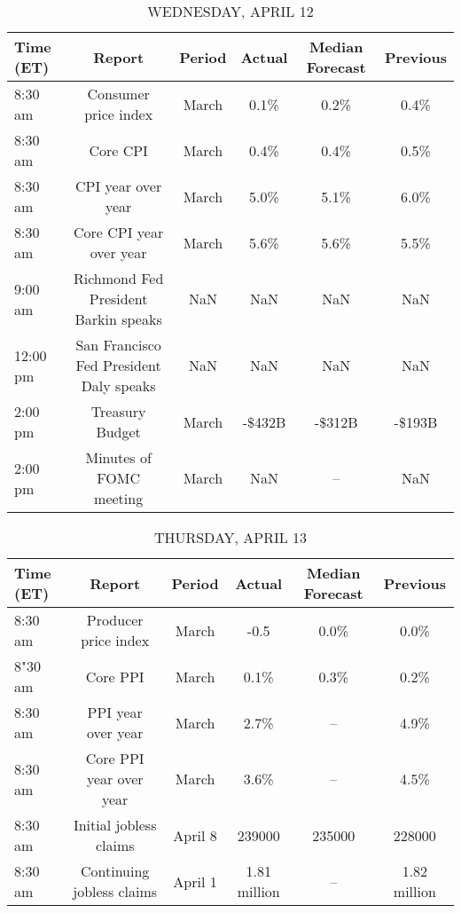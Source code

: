 \documentclass{article}%
\begin{document}
\begin{table}[htbp]%
\caption{WEDNESDAY, APRIL 12}%
\centering%
\begin{adjustbox}{width=1\textwidth}%
\begin{tabular}{lccccc}
\toprule
Time (ET) &                                  Report & Period & Actual & Median Forecast & Previous \\
\midrule
  8:30 am &                    Consumer price index &  March &   0.1\% &            0.2\% &     0.4\% \\
  8:30 am &                                Core CPI &  March &   0.4\% &            0.4\% &     0.5\% \\
  8:30 am &                      CPI year over year &  March &   5.0\% &            5.1\% &     6.0\% \\
  8:30 am &                 Core CPI year over year &  March &   5.6\% &            5.6\% &     5.5\% \\
  9:00 am &    Richmond Fed President Barkin speaks &    NaN &    NaN &             NaN &      NaN \\
 12:00 pm & San Francisco Fed President Daly speaks &    NaN &    NaN &             NaN &      NaN \\
  2:00 pm &                         Treasury Budget &  March & -\$432B &          -\$312B &   -\$193B \\
  2:00 pm &                 Minutes of FOMC meeting &  March &    NaN &              -- &      NaN \\
\bottomrule
\end{tabular}
%
\end{adjustbox}%
\end{table}

%


\begin{table}[htbp]%
\caption{THURSDAY, APRIL 13}%
\centering%
\begin{adjustbox}{width=1\textwidth}%
\begin{tabular}{lccccc}
\toprule
Time (ET) &                    Report &  Period &       Actual & Median Forecast &     Previous \\
\midrule
  8:30 am &      Producer price index &   March &         -0.5 &            0.0\% &         0.0\% \\
  8"30 am &                  Core PPI &   March &         0.1\% &            0.3\% &         0.2\% \\
  8:30 am &        PPI year over year &   March &         2.7\% &              -- &         4.9\% \\
  8:30 am &   Core PPI year over year &   March &         3.6\% &              -- &         4.5\% \\
  8:30 am &    Initial jobless claims & April 8 &       239000 &          235000 &       228000 \\
  8:30 am & Continuing jobless claims & April 1 & 1.81 million &              -- & 1.82 million \\
\bottomrule
\end{tabular}
%
\end{adjustbox}%
\end{table}
\end{document}
